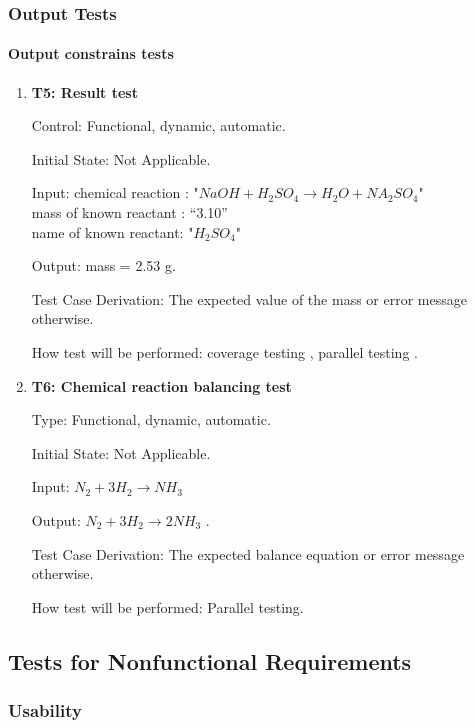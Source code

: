 \documentclass[12pt, titlepage]{article}
\begin{document}
\subsubsection{Output Tests}

\paragraph{Output constrains tests}

\begin{enumerate}

\item{\bf T5: Result test\\}

Control: Functional, dynamic, automatic.
					
Initial State: Not Applicable.
					
Input: chemical reaction : "$NaOH + H_2SO_4 \rightarrow H_2O + NA_2SO_4$"\\ mass
of known reactant : ``3.10''\\ name of known reactant: "$H_2SO_4$"
				
Output: mass = 2.53 g.

Test Case Derivation: The expected value of the mass or error message otherwise.
					
How test will be performed: coverage testing , parallel testing .

\item{\bf T6: Chemical reaction balancing test\\}

Type: Functional, dynamic, automatic.
					
Initial State: Not Applicable.
					
Input: $ N_2 + 3H_2 \rightarrow NH_3 $
					
Output: $ N_2 + 3H_2 \rightarrow 2NH_3 $ .

Test Case Derivation: The expected balance equation or error message otherwise.

How test will be performed: Parallel testing.

\end{enumerate}

\subsection{Tests for Nonfunctional Requirements}

\subsubsection{Usability}		
\end{document}
